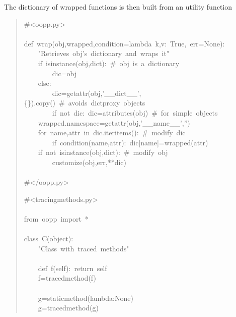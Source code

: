 \documentclass[10pt,english]{article}
\begin{document}
The dictionary of wrapped functions is then built from an utility function
\begin{quote}
\begin{ttfamily}\begin{flushleft}
\mbox{{\#}<oopp.py>}\\
\mbox{}\\
\mbox{def~wrap(obj,wrapped,condition=lambda~k,v:~True,~err=None):}\\
\mbox{~~~~"Retrieves~obj's~dictionary~and~wraps~it"}\\
\mbox{~~~~if~isinstance(obj,dict):~{\#}~obj~is~a~dictionary~}\\
\mbox{~~~~~~~~dic=obj}\\
\mbox{~~~~else:~}\\
\mbox{~~~~~~~~dic=getattr(obj,'{\_}{\_}dict{\_}{\_}',{\{}{\}}).copy()~{\#}~avoids~dictproxy~objects}\\
\mbox{~~~~~~~~if~not~dic:~dic=attributes(obj)~{\#}~for~simple~objects}\\
\mbox{~~~~wrapped.namespace=getattr(obj,'{\_}{\_}name{\_}{\_}','')}\\
\mbox{~~~~for~name,attr~in~dic.iteritems():~{\#}~modify~dic}\\
\mbox{~~~~~~~~if~condition(name,attr):~dic[name]=wrapped(attr)}\\
\mbox{~~~~if~not~isinstance(obj,dict):~{\#}~modify~obj}\\
\mbox{~~~~~~~~customize(obj,err,**dic)~}\\
\mbox{}\\
\mbox{{\#}</oopp.py>}
\end{flushleft}\end{ttfamily}
\begin{ttfamily}\begin{flushleft}
\mbox{{\#}<tracingmethods.py>}\\
\mbox{}\\
\mbox{from~oopp~import~*}\\
\mbox{}\\
\mbox{class~C(object):~}\\
\mbox{~~~~"Class~with~traced~methods"}\\
\mbox{}\\
\mbox{~~~~def~f(self):~return~self~}\\
\mbox{~~~~f=tracedmethod(f)}\\
\mbox{}\\
\mbox{~~~~g=staticmethod(lambda:None)}\\
\mbox{~~~~g=tracedmethod(g)}\\

\end{flushleft}
\end{ttfamily}
\end{quote}
\end{document}
